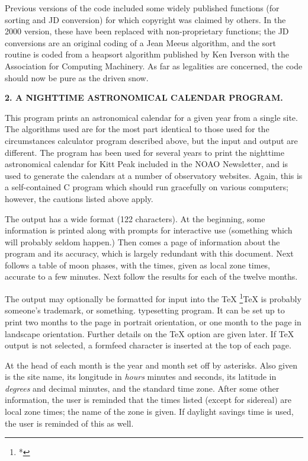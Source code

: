 Previous versions of the code included some widely published 
functions (for sorting and JD conversion) for which copyright was 
claimed by others.  In the 2000 version, these have been  
replaced with non-proprietary functions; the JD conversions are
an original coding of a Jean Meeus algorithm, and the sort routine is
coded from a heapsort algorithm published by Ken Iverson
with the Association for Computing Machinery. As far as 
legalities are concerned, the code should now be pure
as the driven snow.


\par\vfill\eject

\centerline{\bf 2. A NIGHTTIME ASTRONOMICAL CALENDAR PROGRAM.}
\par                     
This program prints an astronomical calendar for a given year
from a single site.  The algorithms used are for the most part
identical to those used for the circumstances calculator program
described above, but the input and output are different.
The program has been used for several years to print the 
nighttime astronomical calendar for Kitt Peak included in the
NOAO Newsletter, and is used to generate the calendars 
at a number of observatory websites.  Again, this is a 
self-contained C program which should run gracefully on various computers;
however, the cautions listed above apply.

The output has a wide format (122 characters).  At the beginning,
some information is printed along with prompts for interactive use
(something which will probably seldom happen.)  Then comes a page
of information about the program and its accuracy, which
is largely redundant with this document.  Next follows a table
of moon phases, with the times, given as local zone times,
accurate to a few minutes.  Next follow the results
for each of the twelve months.  

The output may optionally be formatted for input into the TeX
\footnote{*}{TeX is probably someone's trademark, or something.}
typesetting program.  It can be set up to print two months to 
the page in portrait orientation, or one month to the page in
landscape orientation.  Further details on the TeX option are 
given later.  If TeX output is not selected, a formfeed character 
is inserted at the top of each page.

At the head 
of each month is the year and month set off by asterisks.
Also given is the site name, its longitude in {\it hours} minutes and seconds,
its latitude in {\it degrees} and decimal minutes, and the standard time
zone.  After some other information, the user is reminded that the 
times listed (except for sidereal) are local zone times; the name of the
zone is given.  If daylight savings time is used, the user is reminded
of this as well.

